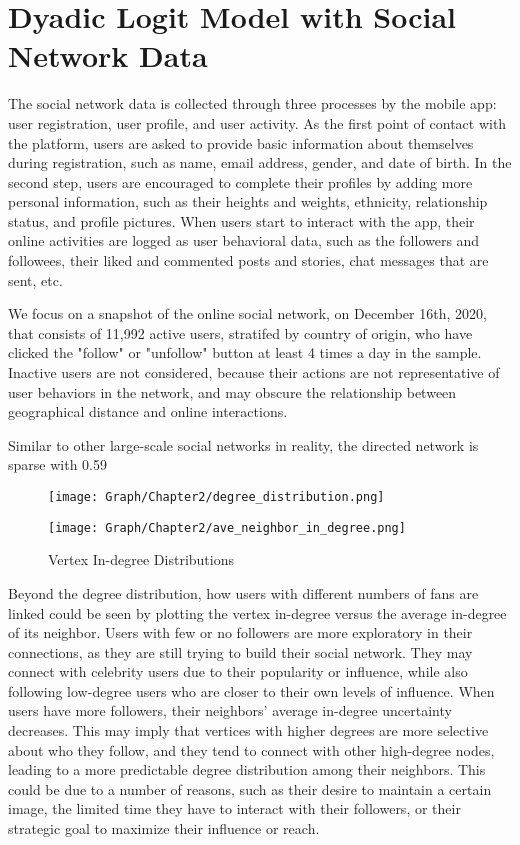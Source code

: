 \section{Dyadic Logit Model with Social Network Data}

The social network data is collected through three processes by the mobile app: user registration, user profile, and user activity. As the first point of contact with the platform, users are asked to provide basic information about themselves during registration, such as name, email address, gender, and date of birth. In the second step, users are encouraged to complete their profiles by adding more personal information, such as their heights and weights, ethnicity, relationship status, and profile pictures. When users start to interact with the app, their online activities are logged as user behavioral data, such as the followers and followees, their liked and commented posts and stories, chat messages that are sent, etc.

We focus on a snapshot of the online social network, on December 16th, 2020, that consists of 11,992 active users, stratifed by country of origin, who have clicked the "follow" or "unfollow" button at least 4 times a day in the sample. Inactive users are not considered, because their actions are not representative of user behaviors in the network, and may obscure the relationship between geographical distance and online interactions.

Similar to other large-scale social networks in reality, the directed network is sparse with 0.59\
\begin{figure} \centering
  \caption{Vertex In-degree Distributions}
  \begin{minipage}[t]{0.45\textwidth}
    \centering
    \texttt{[image: Graph/Chapter2/degree\_distribution.png]}
  \end{minipage}
  \begin{minipage}[t]{0.45\textwidth} \centering
    \texttt{[image: Graph/Chapter2/ave\_neighbor\_in\_degree.png]}
  \end{minipage}
\end{figure}

Beyond the degree distribution, how users with different numbers of fans are linked could be seen by plotting the vertex in-degree versus the average in-degree of its neighbor. Users with few or no followers are more exploratory in their connections, as they are still trying to build their social network. They may connect with celebrity users due to their popularity or influence, while also following low-degree users who are closer to their own levels of influence. When users have more followers, their neighbors' average in-degree uncertainty decreases. This may imply that vertices with higher degrees are more selective about who they follow, and they tend to connect with other high-degree nodes, leading to a more predictable degree distribution among their neighbors. This could be due to a number of reasons, such as their desire to maintain a certain image, the limited time they have to interact with their followers, or their strategic goal to maximize their influence or reach.

